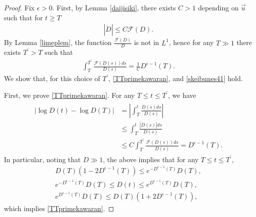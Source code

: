 \documentclass[reqno]{amsart}
\theoremstyle{plain}
\theoremstyle{definition}
\numberwithin{equation}{section}
\newcommand{\1}{\mathbbm{1}}
\begin{document}
\begin{proof}
Fix $\epsilon>0$. First, by Lemma \ref{daijisiki}, there exists $C>1$ depending on $\vec{u}$ such that for $t\geq T$
\begin{align}
|\dot{D}|\leq C\mathcal{F}(D). \label{Dosaeru}
\end{align}
By Lemma \ref{limeplem}, the function $\frac{\mathcal{F}(D)}{D}$ is not in $L^1$, hence for any $T\gg 1$ there exists $T^{\prime}>T$ such that
\begin{align}\label{Tpridef}
\int_T^{T^{\prime}} \frac{\mathcal{F}(D(s))ds}{D(s)}=\frac{1}{C}D^{\epsilon-1}(T).
\end{align}
We show that, for this choice of $T^{\prime}$, \eqref{TTprimekawaran}, and \eqref{skeibunes41} hold.

First, we prove \eqref{TTprimekawaran}. For any $T\leq t\leq T^{\prime}$, we have
\begin{align}
\begin{aligned}
\left| \log{D(t)}-\log{D(T)}\right|
&=\left|\int_T^t \frac{\dot{D}(s)ds}{D(s)}\right|
\\
&\leq \int_T^t \frac{|\dot{D}(s)|ds}{D(s)}
\\
&\leq C\int_T^{T^{\prime}} \frac{\mathcal{F}(D(s))ds}{D(s)}
= D^{\epsilon-1}(T).
\end{aligned}
\end{align}
In particular, noting that $D\gg 1$, the above implies that for any $T\leq t\leq T^{\prime}$,
\begin{align*}
D(T)(1-2D^{\epsilon-1}(T))\leq e^{-D^{\epsilon-1}(T)}D(T),
\\
e^{-D^{\epsilon-1}(T)}D(T)\leq D(t)\leq e^{D^{\epsilon-1}(T)}D(T),
\\
e^{D^{\epsilon-1}(T)}D(T)\leq D(T)(1+2D^{\epsilon-1}(T)),
\end{align*}
which implies \eqref{TTprimekawaran}.


\end{proof}
\end{document}
